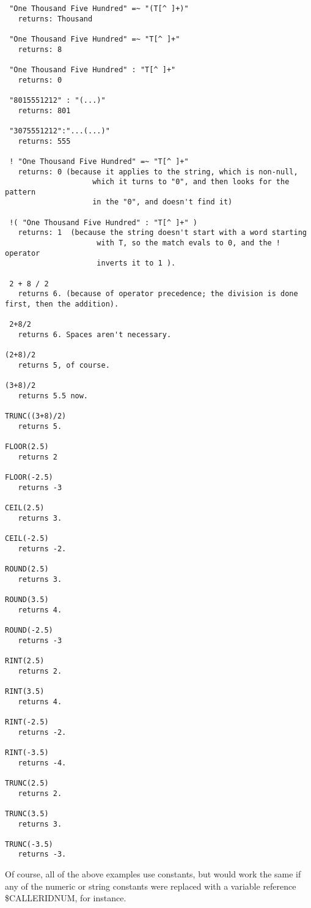 \begin{verbatim}
 "One Thousand Five Hundred" =~ "(T[^ ]+)"
   returns: Thousand

 "One Thousand Five Hundred" =~ "T[^ ]+"
   returns: 8

 "One Thousand Five Hundred" : "T[^ ]+"
   returns: 0

 "8015551212" : "(...)"
   returns: 801

 "3075551212":"...(...)"
   returns: 555

 ! "One Thousand Five Hundred" =~ "T[^ ]+"
   returns: 0 (because it applies to the string, which is non-null,
                    which it turns to "0", and then looks for the pattern
                    in the "0", and doesn't find it)

 !( "One Thousand Five Hundred" : "T[^ ]+" )
   returns: 1  (because the string doesn't start with a word starting
                     with T, so the match evals to 0, and the ! operator
                     inverts it to 1 ).

 2 + 8 / 2
   returns 6. (because of operator precedence; the division is done first, then the addition).

 2+8/2
   returns 6. Spaces aren't necessary.

(2+8)/2
   returns 5, of course.

(3+8)/2
   returns 5.5 now.

TRUNC((3+8)/2)
   returns 5.

FLOOR(2.5)
   returns 2

FLOOR(-2.5)
   returns -3

CEIL(2.5)
   returns 3.

CEIL(-2.5)
   returns -2.

ROUND(2.5)
   returns 3.

ROUND(3.5)
   returns 4.

ROUND(-2.5)
   returns -3

RINT(2.5)
   returns 2.

RINT(3.5)
   returns 4.

RINT(-2.5)
   returns -2.

RINT(-3.5)
   returns -4.

TRUNC(2.5)
   returns 2.

TRUNC(3.5)
   returns 3.

TRUNC(-3.5)
   returns -3.

\end{verbatim}

Of course, all of the above examples use constants, but would work the
same if any of the numeric or string constants were replaced with a
variable reference \${CALLERIDNUM}, for instance.


